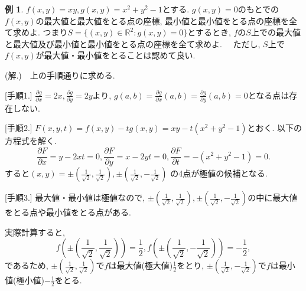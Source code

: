 \documentclass[dvipdfmx,a4paper,11pt]{article}
\newcommand{\R}{\mathbb{R}}
\theoremstyle{definition}
\newtheorem{exa}[thm]{例}
\newcommand{\pdrv}[2]{\frac{\partial #1}{\partial #2}}
\begin{document}
\begin{exa}
\label{lan_exa}
$f(x,y) = xy, g(x,y) = x^2+y^2-1$とする.
$g(x,y) =0$のもとでの$f(x,y)$の最大値と最大値をとる点の座標, 最小値と最小値をとる点の座標を全て求めよ. つまり$S = \{ (x,y) \in \R^2: g(x,y)=0\}$とするとき, $f$の$S$上での最大値と最大値及び最小値と最小値をとる点の座標を全て求めよ.　
 ただし, $S$上で$f(x,y)$が最大値・最小値をとることは認めて良い.

(解.)　上の手順通りに求める.

 [手順1.]
 $\pdrv{g}{x}=2x, \pdrv{g}{y}=2y$より, $g(a,b)=\pdrv{g}{x}(a,b)=\pdrv{g}{y}(a,b)=0$となる点は存在しない.
 
[手順2.] $F(x,y,t) = f(x,y)-tg(x,y) = xy - t(x^2 + y^2 -1)$とおく.
以下の方程式を解く.
$$
\pdrv{F}{x} = y-2xt=0,
\pdrv{F}{y}= x-2yt=0,
\pdrv{F}{t} =-(x^2+y^2-1)=0.
$$
すると$(x,y) =\pm \left(\frac{1}{\sqrt{2}},\frac{1}{\sqrt{2}}\right) , \pm \left(\frac{1}{\sqrt{2}},-\frac{1}{\sqrt{2}}\right)$
の4点が極値の候補となる.

[手順3.] 最大値・最小値は極値なので, $\pm \left(\frac{1}{\sqrt{2}},\frac{1}{\sqrt{2}}\right) , \pm \left(\frac{1}{\sqrt{2}},-\frac{1}{\sqrt{2}}\right)$の中に最大値をとる点や最小値をとる点がある.

実際計算すると, 
$$
f\left(\pm \left(\frac{1}{\sqrt{2}},\frac{1}{\sqrt{2}}\right)\right)=\frac{1}{2}, 
f\left(\pm \left(\frac{1}{\sqrt{2}},-\frac{1}{\sqrt{2}}\right)\right)=-\frac{1}{2}, 
$$
であるため, $\pm \left(\frac{1}{\sqrt{2}},\frac{1}{\sqrt{2}}\right) $で$f$は最大値(極大値)$\frac{1}{2}$をとり, 
$\pm \left(\frac{1}{\sqrt{2}},-\frac{1}{\sqrt{2}}\right)$で$f$は最小値(極小値)$-\frac{1}{2}$をとる.

\end{exa}

   
\end{document}
